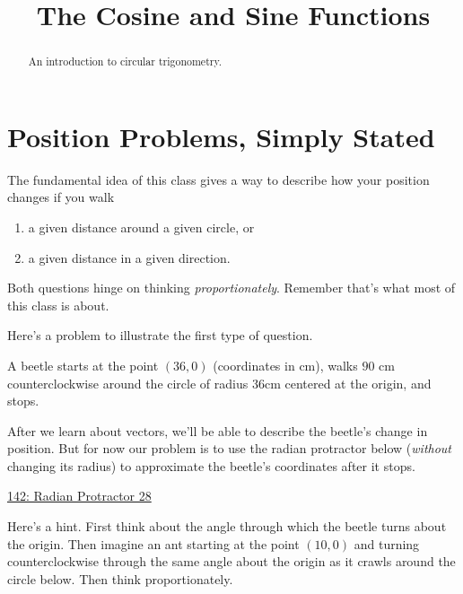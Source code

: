 \documentclass{ximera}
\title{The Cosine and Sine Functions}
\begin{document}
\begin{abstract}
An introduction to circular trigonometry.
\end{abstract}
\maketitle


\section{Position Problems, Simply Stated}

The fundamental idea of this class gives a way to describe how your position changes if you walk

\begin{enumerate}
\item a given distance around a given circle, or

\item a given distance in a given direction. 
\end{enumerate}

Both questions hinge on thinking \emph{proportionately}. Remember that's what most of this class is about.
 
Here's a problem to illustrate the first type of question.

\begin{question} \label{QBeerteee}
A beetle starts at the point $(36,0)$ (coordinates in cm), walks $90$ cm counterclockwise around the circle of radius $36$cm centered at the origin, and stops. 

After we learn about vectors, we'll be able to describe the beetle's change in position. But for now our problem is to use the radian protractor below (\emph{without} changing its radius) to approximate the beetle's coordinates after it stops.

\begin{onlineOnly}
    \begin{center}
\end{center}

\href{https://www.desmos.com/calculator/jqc8dd0iws}{142: Radian Protractor 28}

\end{onlineOnly}

\begin{hint}
Here's a hint. First think about the angle through which the beetle turns about the origin. Then imagine an ant starting at the point $(10,0)$ and turning counterclockwise through the same angle about the origin  as it crawls around the circle below. Then think proportionately.
\end{hint}

\end{question}
\end{document}
